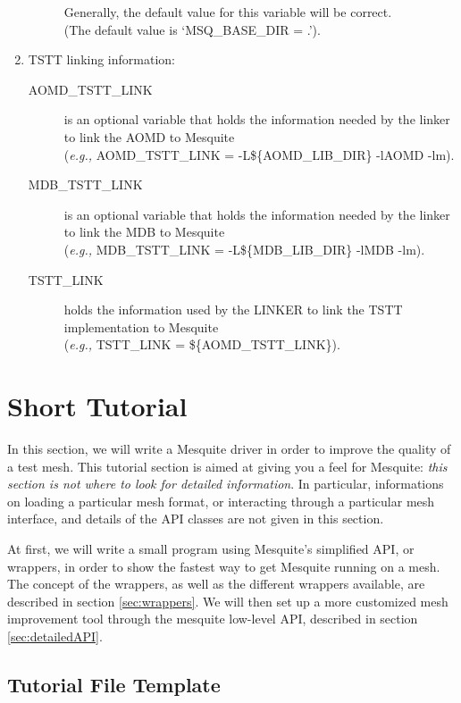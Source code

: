 \documentclass[letter]{report}
\begin{document}
\begin{enumerate}
\begin{description}
	Generally, the default value for this variable will be correct.\\
	(The default value is `MSQ\_BASE\_DIR = .').
  \end{description}
\item TSTT linking information:
\begin{description}
  \item[AOMD\_TSTT\_LINK] is an optional variable that holds the
	information needed by the linker to link the AOMD to Mesquite\\
	({\it e.g.,} AOMD\_TSTT\_LINK = -L\$\{AOMD\_LIB\_DIR\} -lAOMD -lm).
  \item[MDB\_TSTT\_LINK] is an optional variable that holds the
	information needed by the linker to link the MDB to Mesquite\\
	({\it e.g.,} MDB\_TSTT\_LINK = -L\$\{MDB\_LIB\_DIR\} -lMDB -lm).
  \item[TSTT\_LINK] holds the information used by the LINKER to link
	the TSTT implementation to Mesquite \\
	({\it e.g.,} TSTT\_LINK = \$\{AOMD\_TSTT\_LINK\}).
\end{description}
\end{enumerate}

\section{Short Tutorial}

In this section, we will write a Mesquite driver in order to improve the quality of a test
mesh. This tutorial section is aimed at giving you a feel for Mesquite: \emph{this section is not where to look
for detailed information}. In particular, informations on loading a particular mesh format, or
interacting through a particular mesh interface, and details of the API classes
are not given in this section.

At first, we will write a small program using Mesquite's simplified API, or wrappers, in order to show the
fastest way to get Mesquite running on a mesh. The concept of the wrappers, as well as the different
wrappers available, are described in section \ref{sec:wrappers}. We will then set up a more customized mesh
improvement tool through the mesquite low-level API, described in section \ref{sec:detailedAPI}.

\subsection{Tutorial File Template}
\label{sec:tutfile}
\end{document}
